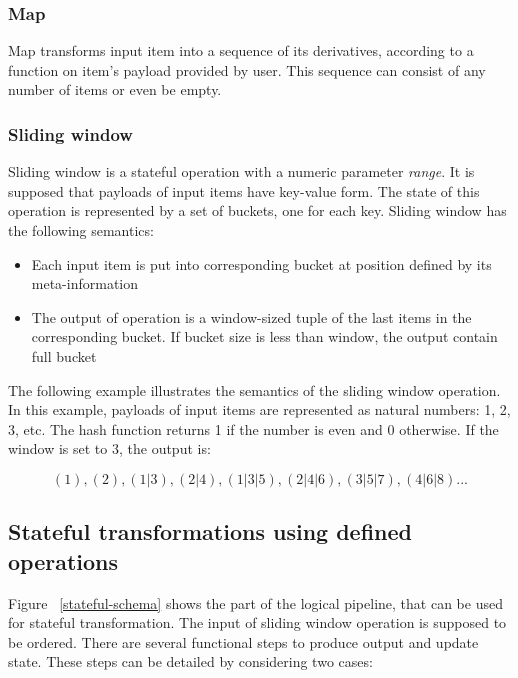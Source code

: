 \subsubsection{Map}
Map transforms input item into a sequence of its derivatives, according to a function on item's payload provided by user. This sequence can consist of any number of items or even be empty.

\subsubsection{Sliding window}
Sliding window is a stateful operation with a numeric parameter {\it range}. It is supposed that payloads of input items  have key-value form. The state of this operation is represented by a set of buckets, one for each key. Sliding window has the following semantics:

\begin{itemize}
    \item Each input item is put into corresponding bucket at position defined by its meta-information
    \item The output of operation is a window-sized tuple of the last items in the corresponding bucket. If bucket size is less than window, the output contain full bucket
\end{itemize}

The following example illustrates the semantics of the sliding window operation. In this example, payloads of input items are represented as natural numbers: 1, 2, 3, etc. The hash function returns 1 if the number is even and 0 otherwise. If the window is set to 3, the output is:

\[(1), (2), (1|3), (2|4), (1|3|5), (2|4|6), (3|5|7), (4|6|8)...\]

\subsection{Stateful transformations using defined operations}
Figure ~\ref{stateful-schema} shows the part of the logical pipeline, that can be used for stateful transformation. The input of sliding window operation is supposed to be ordered. There are several functional steps to produce output and update state. These steps can be detailed by considering two cases:

